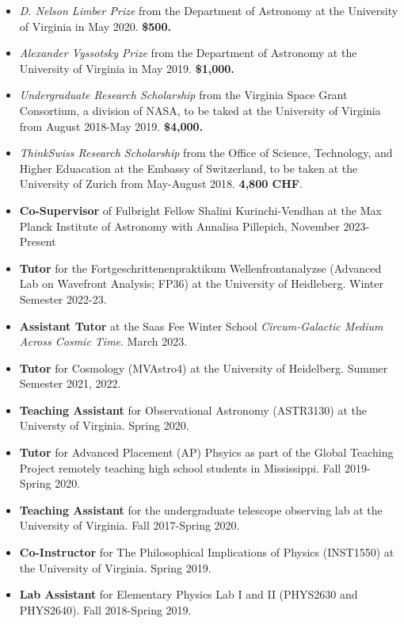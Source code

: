 \documentclass[a4paper,10pt,oneside]{article}
\begin{document}
\begin{itemize}[wide, labelwidth=!, labelindent=-11pt, parsep=0pt]
    \item {\it D. Nelson Limber Prize} from the Department of Astronomy at the University of Virginia in May 2020. {\bf \$500.}
    \item {\it Alexander Vyssotsky Prize} from the Department of Astronomy at the University of Virginia in May 2019. {\bf \$1,000.}
    \item {\it Undergraduate Research Scholarship} from the Virginia Space Grant Consortium, a division of NASA, to be taked at the University of Virginia from August 2018-May 2019. {\bf \$4,000.} 
    \item {\it ThinkSwiss Research Scholarship} from the Office of Science, Technology, and Higher Eduacation at the Embassy of Switzerland, to be taken at the University of Zurich from May-August 2018. {\bf 4,800 CHF}.
\end{itemize}

\noindent{}

\begin{itemize}[wide, labelwidth=!, labelindent=-11pt, parsep=0pt]
    \item {\bf Co-Supervisor} of Fulbright Fellow Shalini Kurinchi-Vendhan at the Max Planck Institute of Astronomy with Annalisa Pillepich, November 2023-Present
    \item {\bf Tutor} for the Fortgeschrittenenpraktikum Wellenfrontanalyzse (Advanced Lab on Wavefront Analysis; FP36) at the University of Heidleberg. Winter Semester 2022-23.
    \item {\bf Assistant Tutor} at the Saas Fee Winter School {\it Circum-Galactic Medium Across Cosmic Time}. March 2023. 
    \item {\bf Tutor} for Cosmology (MVAstro4) at the University of Heidelberg. Summer Semester 2021, 2022.
    \item {\bf Teaching Assistant} for Observational Astronomy (ASTR3130) at the Universty of Virginia. Spring 2020.
    \item {\bf Tutor} for Advanced Placement (AP) Phsyics as part of the Global Teaching Project remotely teaching high school students in Mississippi. Fall 2019-Spring 2020.
    \item {\bf Teaching Assistant} for the undergraduate telescope observing lab at the University of Virginia. Fall 2017-Spring 2020. 
    \item {\bf Co-Instructor} for The Philosophical Implications of Physics (INST1550) at the University of Virginia. Spring 2019.
    \item {\bf Lab Assistant} for Elementary Physics Lab I and II (PHYS2630 and PHYS2640). Fall 2018-Spring 2019. 
\end{itemize}
\end{document}
